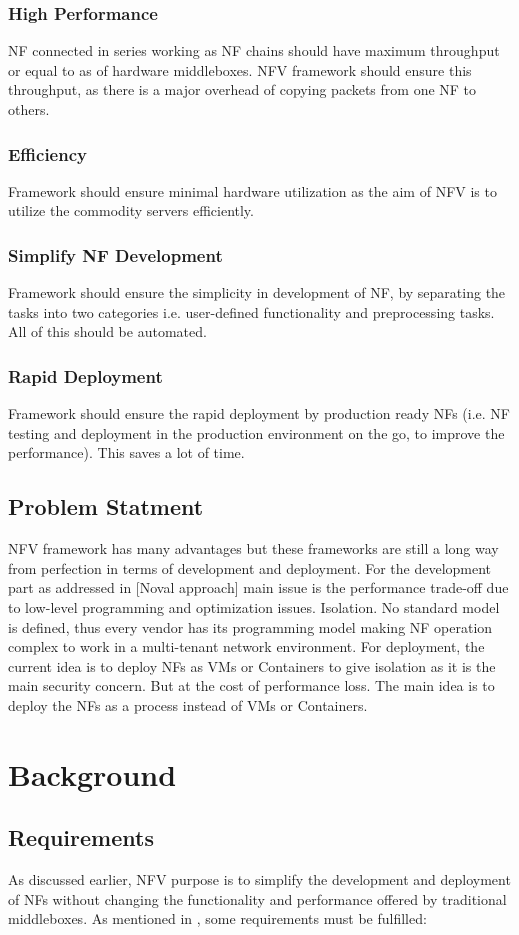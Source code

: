 \documentclass[10pt, a4paper, conference]{IEEEtran}
\begin{document}
\subsubsection{High Performance} NF connected in series working as NF chains should have maximum throughput or equal to as of hardware middleboxes. NFV framework should ensure this throughput, as there is a major overhead of copying packets from one NF to others.
\subsubsection{Efficiency} Framework should ensure minimal hardware utilization as the aim of NFV is to utilize the commodity servers efficiently.
\subsubsection{Simplify NF Development} Framework should ensure the simplicity in development of NF, by separating the tasks into two categories i.e. user-defined functionality and preprocessing tasks. All of this should be automated. 
\subsubsection{Rapid Deployment} Framework should ensure the rapid deployment by production ready NFs (i.e. NF testing and deployment in the production environment on the go, to improve the performance). This saves a lot of time.
\subsection*{Problem Statment}
NFV framework has many advantages but these frameworks are still a long way from perfection in terms of development and deployment. For the development part as addressed in [Noval approach] main issue is the performance trade-off due to low-level programming and optimization issues. Isolation. No standard model is defined, thus every vendor has its programming model making NF operation complex to work in a multi-tenant network environment. For deployment, the current idea is to deploy NFs as VMs or Containers to give isolation as it is the main security concern. But at the cost of performance loss. The main idea is to deploy the NFs as a process instead of VMs or Containers.
\section{Background}
\subsection*{Requirements}
As discussed earlier, NFV purpose is to simplify the development and deployment of NFs without changing the functionality and performance offered by traditional middleboxes. As mentioned in \cite{Panda2017}, some requirements must be fulfilled:
\end{document}
